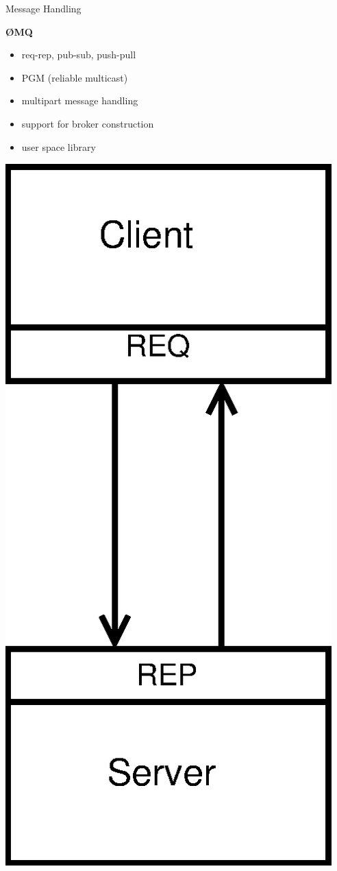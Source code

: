 \documentclass[default,pdf,colorBG,slideColor]{prosper}
\newcommand{\zMQ}{\O{}MQ}
\begin{document}
\begin{slide}{Message Handling}{\small
  \hfill
  \begin{minipage}{0.5\textwidth}
  {\bf \zMQ}
  \begin{itemize}
    \item{req-rep, pub-sub, push-pull}
    \item{PGM (reliable multicast)}
    \item{multipart message handling}
    \item{support for broker construction}
    \item{user space library}
  \end{itemize}
  \begin{center}
    \begin{minipage}[b]{0.15\linewidth}
    \includegraphics[scale=0.08]{comms_zmq_reqrep}

\end{minipage}
\end{center}
\end{minipage}}
\end{slide}
\end{document}
